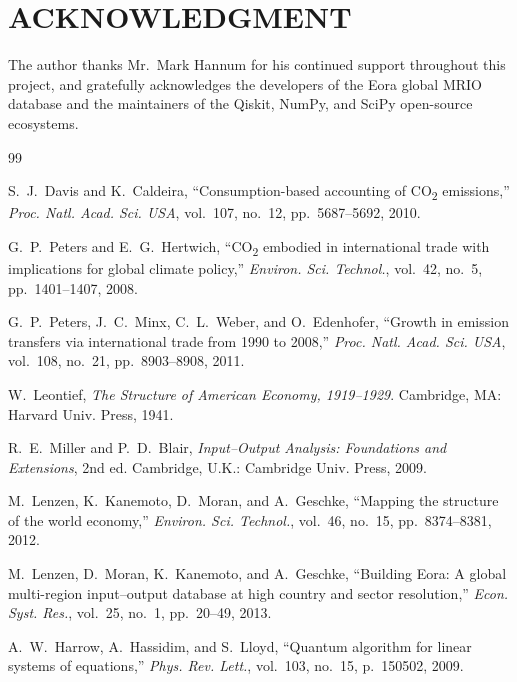 \documentclass[letterpaper, 10 pt, conference]{ieeeconf}
\newcommand{\COO}{CO\textsubscript{2}}
\begin{document}
\addtolength{\textheight}{-12cm}

\section*{ACKNOWLEDGMENT}

The author thanks Mr.\ Mark Hannum for his continued support throughout this project, and gratefully acknowledges the developers of the Eora global MRIO database and the maintainers of the Qiskit, NumPy, and SciPy open-source ecosystems.

\begin{thebibliography}{99}

S.~J.~Davis and K.~Caldeira, ``Consumption-based accounting of \COO{} emissions,'' \textit{Proc. Natl. Acad. Sci. USA}, vol.~107, no.~12, pp.~5687--5692, 2010.

G.~P.~Peters and E.~G.~Hertwich, ``\COO{} embodied in international trade with implications for global climate policy,'' \textit{Environ. Sci. Technol.}, vol.~42, no.~5, pp.~1401--1407, 2008.

G.~P.~Peters, J.~C.~Minx, C.~L.~Weber, and O.~Edenhofer, ``Growth in emission transfers via international trade from 1990 to 2008,'' \textit{Proc. Natl. Acad. Sci. USA}, vol.~108, no.~21, pp.~8903--8908, 2011.

W.~Leontief, \textit{The Structure of American Economy, 1919--1929}. Cambridge, MA: Harvard Univ. Press, 1941.

R.~E.~Miller and P.~D.~Blair, \textit{Input--Output Analysis: Foundations and Extensions}, 2nd ed. Cambridge, U.K.: Cambridge Univ. Press, 2009.

M.~Lenzen, K.~Kanemoto, D.~Moran, and A.~Geschke, ``Mapping the structure of the world economy,'' \textit{Environ. Sci. Technol.}, vol.~46, no.~15, pp.~8374--8381, 2012.

M.~Lenzen, D.~Moran, K.~Kanemoto, and A.~Geschke, ``Building Eora: A global multi-region input--output database at high country and sector resolution,'' \textit{Econ. Syst. Res.}, vol.~25, no.~1, pp.~20--49, 2013.

A.~W.~Harrow, A.~Hassidim, and S.~Lloyd, ``Quantum algorithm for linear systems of equations,'' \textit{Phys. Rev. Lett.}, vol.~103, no.~15, p.~150502, 2009.


\end{thebibliography}
\end{document}
